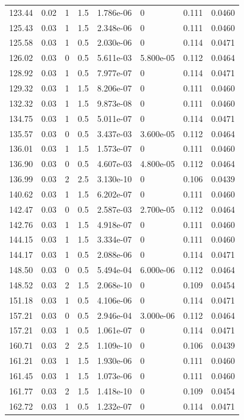\documentclass[preview]{standalone}
\begin{document}
{{{\begin{tabular}{L{1.2cm}C{1.2cm} C{0.3cm}C{0.5cm} C{1.4cm}C{1.4cm} C{1.4cm}C{1.4cm}}
  123.44  &  0.02  & 1     & 1.5 &  1.786e-06  & 0  & 0.111 &  0.0460   \\ 
  125.43  &  0.03  & 1     & 1.5 &  2.348e-06  & 0  & 0.111 &  0.0460   \\ 
  125.58  &  0.03  & 1     & 0.5 &  2.030e-06  & 0  & 0.114 &  0.0471   \\ 
  126.02  &  0.03  & 0     & 0.5 &  5.611e-03  & 5.800e-05  & 0.112 &  0.0464   \\ 
  128.92  &  0.03  & 1     & 0.5 &  7.977e-07  & 0  & 0.114 &  0.0471   \\ 
  129.32  &  0.03  & 1     & 1.5 &  8.206e-07  & 0  & 0.111 &  0.0460   \\ 
  132.32  &  0.03  & 1     & 1.5 &  9.873e-08  & 0  & 0.111 &  0.0460   \\ 
  134.75  &  0.03  & 1     & 0.5 &  5.011e-07  & 0  & 0.114 &  0.0471   \\ 
  135.57  &  0.03  & 0     & 0.5 &  3.437e-03  & 3.600e-05  & 0.112 &  0.0464   \\ 
  136.01  &  0.03  & 1     & 1.5 &  1.573e-07  & 0  & 0.111 &  0.0460   \\ 
  136.90  &  0.03  & 0     & 0.5 &  4.607e-03  & 4.800e-05  & 0.112 &  0.0464   \\ 
  136.99  &  0.03  & 2     & 2.5 &  3.130e-10  & 0  & 0.106 &  0.0439   \\ 
  140.62  &  0.03  & 1     & 1.5 &  6.202e-07  & 0  & 0.111 &  0.0460   \\ 
  142.47  &  0.03  & 0     & 0.5 &  2.587e-03  & 2.700e-05  & 0.112 &  0.0464   \\ 
  142.76  &  0.03  & 1     & 1.5 &  4.918e-07  & 0  & 0.111 &  0.0460   \\ 
  144.15  &  0.03  & 1     & 1.5 &  3.334e-07  & 0  & 0.111 &  0.0460   \\ 
  144.17  &  0.03  & 1     & 0.5 &  2.088e-06  & 0  & 0.114 &  0.0471   \\ 
  148.50  &  0.03  & 0     & 0.5 &  5.494e-04  & 6.000e-06  & 0.112 &  0.0464   \\ 
  148.52  &  0.03  & 2     & 1.5 &  2.068e-10  & 0  & 0.109 &  0.0454   \\ 
  151.18  &  0.03  & 1     & 0.5 &  4.106e-06  & 0  & 0.114 &  0.0471   \\ 
  157.21  &  0.03  & 0     & 0.5 &  2.946e-04  & 3.000e-06  & 0.112 &  0.0464   \\ 
  157.21  &  0.03  & 1     & 0.5 &  1.061e-07  & 0  & 0.114 &  0.0471   \\ 
  160.71  &  0.03  & 2     & 2.5 &  1.109e-10  & 0  & 0.106 &  0.0439   \\ 
  161.21  &  0.03  & 1     & 1.5 &  1.930e-06  & 0  & 0.111 &  0.0460   \\ 
  161.45  &  0.03  & 1     & 1.5 &  1.073e-06  & 0  & 0.111 &  0.0460   \\ 
  161.77  &  0.03  & 2     & 1.5 &  1.418e-10  & 0  & 0.109 &  0.0454   \\ 
  162.72  &  0.03  & 1     & 0.5 &  1.232e-07  & 0  & 0.114 &  0.0471   \\ 
\hline 
\end{tabular} 

}}}
\end{document}
